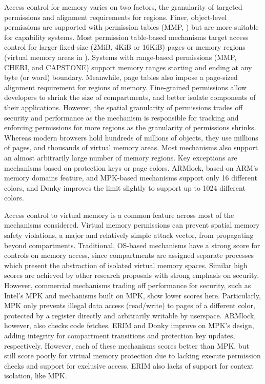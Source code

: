 Access control for memory varies on two factors, the granularity of targeted
permissions and alignment requirements for regions.
Finer, object-level permissions are supported with 
permission tables (MMP, \seccells) but are more suitable for capability systems.
Most permission table-based mechanisms target access control for larger
fixed-size (2MiB, 4KiB or 16KiB) pages or 
memory regions (virtual memory areas in \seccells).
Systems with range-based permissions (MMP, CHERI, \seccells and CAPSTONE) support
memory ranges starting and ending at any byte (or word) boundary.
Meanwhile, page tables also impose a page-sized alignment requirement for
regions of memory.
Fine-grained permissions allow developers to shrink the size of compartments, 
and better isolate components of their applications.
However, the spatial granularity of permissions trades off security and
performance as the mechanism is responsible for tracking and enforcing
permissions for more regions as the granularity of permissions shrinks.
Whereas modern browsers hold hundreds of millions of objects, they use
millions of pages, and thousands of virtual memory areas.
Most mechanisms also support an almost arbitrarily large number of memory
regions.
Key exceptions are mechanisms based on protection keys or page colors.
ARMlock, based on ARM's memory domains feature,
and MPK-based mechanisms support only 16 different colors, and 
Donky improves the limit slightly to support up to
1024 different colors.

Access control to virtual memory is a common feature across most of the
mechanisms considered.
Virtual memory permissions can prevent spatial memory safety violations,
a major and relatively simple attack vector, from propagating
beyond compartments.
Traditional, OS-based mechanisms have a strong score for controls on 
memory access, since compartments are assigned separate processes which present
the abstraction of isolated virtual memory spaces.
Similar high scores are achieved by other research proposals with strong
emphasis on security. 
However, commercial mechanisms trading off performance for security, such as
Intel's MPK and mechanisms built on MPK, show lower scores here.
Particularly, MPK only prevents illegal data access (read/write) to pages
of a different color, protected by a register directly and arbitrarily
writable by userspace.
ARMlock, however, also checks code fetches.
ERIM and Donky improve on MPK's design, adding integrity for compartment
transitions and protection key updates, respectively. 
However, each of these mechanisms scores better than MPK, but still score 
poorly for virtual memory protection due to lacking execute permission
checks and support for exclusive access.
ERIM also lacks of support for context isolation, like MPK.

